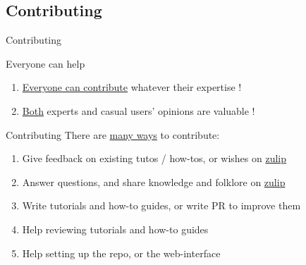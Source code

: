 \documentclass[10pt]{beamer}
\begin{document}
\subsection{Contributing}


\begin{frame}{Contributing}
  \begin{tcbObj}{Everyone can help}
    \begin{enumerate}
      \item<1-> \ul{Everyone can contribute} whatever their expertise !
      \item<2-> \ul{Both} experts and casual users' opinions are valuable !
    \end{enumerate}
  \end{tcbObj}
  \begin{tcbProp}{Contributing}
    There are \ul{many ways} to contribute:
    \begin{enumerate}
      \item<3-> Give feedback on existing tutos / how-tos, or wishes on
      \textcolor{blue}{\href{https://www.theozimmermann.net/platform-docs/}{zulip}}
      \item<4-> Answer questions, and share knowledge and folklore on
      \textcolor{blue}{\href{https://www.theozimmermann.net/platform-docs/}{zulip}}
      \item<5-> Write tutorials and how-to guides, or write PR to improve them
      \item<6-> Help reviewing tutorials and how-to guides
      \item<7-> Help setting up the repo, or the web-interface
    \end{enumerate}
  \end{tcbProp}
\end{frame}
\end{document}
